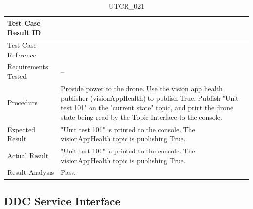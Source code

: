 \documentclass[12pt, titlepage]{article}
\begin{document}
\begin{table}[!h]
\begin{center}
\caption {UTCR\_021}
\label{tab:UTCR_021}
\begin{tabular}{ | m{3.2cm} | m{12.2cm} | } 
\hline
Test Case Result ID & \nameref{tab:UTCR_021} \\ 
\hline
Test Case Reference & \nameref{tab:UTC_021}  \\ 
\hline
Requirements Tested & -- \\ 
\hline
Procedure & Provide power to the drone. Use the vision app health publisher (visionAppHealth) to publish True. Publish "Unit test 101" on the "current state" topic, and print the drone state being read by the Topic Interface to the console. \\ 
\hline
Expected Result & "Unit test 101" is printed to the console. The visionAppHealth topic is publishing True. \\
\hline
Actual Result & "Unit test 101" is printed to the console. The visionAppHealth topic is publishing True. \\
\hline
Result Analysis & Pass. \\ 
\hline
\end{tabular}
\end{center}
\end{table}

\clearpage

\subsection{DDC Service Interface}
\label{ddcServiceInterface}
\end{document}
